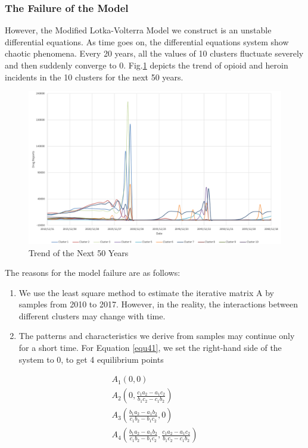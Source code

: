 \documentclass[12pt]{article}
\begin{document}
\subsubsection{The Failure of the Model}
However, the Modified Lotka-Volterra Model we construct is an unstable differential equations. As time goes on, the differential equations system show chaotic phenomena. Every 20 years, all the values of 10 clusters fluctuate severely and then suddenly converge to 0. Fig.\ref{Fig8} depicts the trend of opioid and heroin incidents in the 10 clusters for the next 50 years.
\begin{figure}[H]
	\centering
	\includegraphics[scale=0.6]{./figures/8.png}
	\caption{Trend of the Next 50 Years}
	\label{Fig8}
\end{figure}

The reasons for the model failure are as follows:
\begin{enumerate}
	\item We use the least square method to estimate the iterative matrix A by samples from 2010 to 2017. However, in the reality, the interactions between different clusters may change with time. 
	\item The patterns and characteristics we derive from samples may continue only for a short time.
	For Equation \ref{equ41}, we set the right-hand side of the system to 0, to get 4 equilibrium points
\end{enumerate}
\begin{gather*}
	A_{1}(0, 0) \\
	A_{2}(0, \frac{c_{1}a_{2}-a_{1}c_{2}}{b_{1}c_{2}-c_{1}b_{2}}) \\
	A_{3}(\frac{b_{1}a_{2} - a_{1}b_{2}}{c_{1}b_{2}-b_{1}c_{2}}, 0) \\
	A_{4}(\frac{b_{1}a_{2} - a_{1}b_{2}}{c_{1}b_{2}-b_{1}c_{2}}, \frac{c_{1}a_{2}-a_{1}c_{2}}{b_{1}c_{2}-c_{1}b_{2}}) 
\end{gather*}
\end{document}
